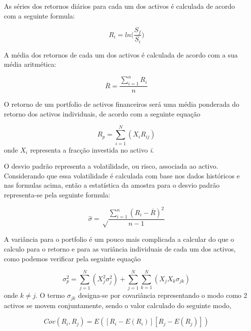 \documentclass[
  12pt,
  a4paper,
  openany]{book}
\begin{document}
As séries dos retornos diários para cada um dos activos é calculada de acordo com a seguinte formula:

\begin{equation} 
  R_i = ln\Big(\frac{S_f}{S_i}\Big)
  \label{eq:logRet}
\end{equation}

A média dos retornos de cada um dos activos é calculada de acordo com a sua média aritmética:

\begin{equation} 
  \overline{R} = \frac{\displaystyle\sum_{i=1}^n R_i}{n}
  \label{eq:meanRet}
\end{equation}

O retorno de um portfolio de activos financeiros será uma média ponderada do retorno dos activos individuais, de acordo com a seguinte equação

\begin{equation} 
    R_{p} = \sum_{i=1}^{N}(X_{i}R_{ij})
  \label{eq:retp}
\end{equation}
onde \(X_{i}\) representa a fracção investida no activo \emph{i}.

O desvio padrão representa a volatilidade, ou risco, associada ao activo. Considerando que essa volatilidade é calculada com base nos dados históricos e nas formulas acima, então a estatística da amostra para o desvio padrão representa-se pela seguinte formula:

\begin{equation} 
  \hat{\sigma} = \sqrt\frac{\displaystyle\sum_{i=1}^n (R_i-\overline{R})^2}{n-1}
  \label{eq:estdesviopadrao}
\end{equation}

A variância para o portfolio é um pouco mais complicada a calcular do que o calculo para o retorno e para as variância individuais de cada um dos activos, como podemos verificar pela seguinte equação

\begin{equation} 
  \sigma_{p}^{2} = \sum_{j=1}^{N}(X_{j}^{2}\sigma_{j}^{2})+\sum_{j=1}^{N}\sum_{k=1}^{N}(X_{j}X_{k}\sigma_{jk})
  \label{eq:estdesviopadraop}
\end{equation}
onde \(k\neq j\). O termo \(\sigma_{jk}\) designa-se por covariância representando o modo como 2 activos se movem conjuntamente, sendo o valor calculado do seguinte modo,

\begin{equation} 
  Cov(R_{i},R_{j}) = E([R_{i}-E(R_{i})][R_{j}-E(R_{j})])
  \label{eq:covariancia}
\end{equation}
\end{document}

